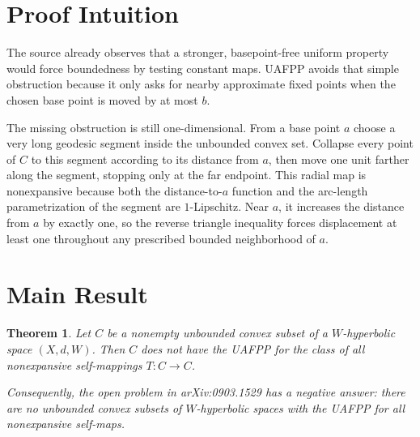 \documentclass[11pt]{article}
\newtheorem{theorem}{Theorem}
\begin{document}
\section*{Proof Intuition}

The source already observes that a stronger, basepoint-free uniform property
would force boundedness by testing constant maps. UAFPP avoids that simple
obstruction because it only asks for nearby approximate fixed points when the
chosen base point is moved by at most $b$.

The missing obstruction is still one-dimensional. From a base point $a$ choose
a very long geodesic segment inside the unbounded convex set. Collapse every
point of $C$ to this segment according to its distance from $a$, then move one
unit farther along the segment, stopping only at the far endpoint. This radial
map is nonexpansive because both the distance-to-$a$ function and the
arc-length parametrization of the segment are $1$-Lipschitz. Near $a$, it
increases the distance from $a$ by exactly one, so the reverse triangle
inequality forces displacement at least one throughout any prescribed bounded
neighborhood of $a$.

\section*{Main Result}

\begin{theorem}
Let $C$ be a nonempty unbounded convex subset of a $W$-hyperbolic space
$(X,d,W)$. Then $C$ does not have the UAFPP for the class of all nonexpansive
self-mappings $T:C\to C$.

Consequently, the open problem in arXiv:0903.1529 has a negative answer:
there are no unbounded convex subsets of $W$-hyperbolic spaces with the UAFPP
for all nonexpansive self-maps.
\end{theorem}
\end{document}
